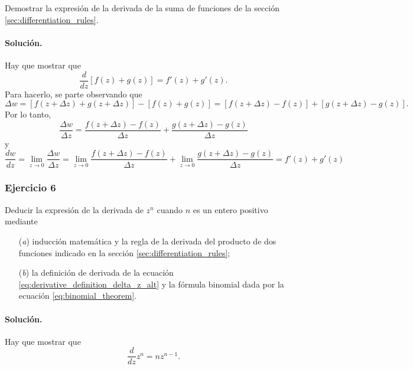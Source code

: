 \documentclass[a4paper]{report}
\begin{document}
Demostrar la expresión de la derivada de la suma de funciones de la sección \ref{sec:differentiation_rules}.

\paragraph{Solución.} Hay que mostrar que 
\[
 \frac{d}{dz}[f(z)+g(z)]=f'(z)+g'(z).
\]
Para hacerlo, se parte observando que 
\[
 \Delta w=[f(z+\Delta z)+g(z+\Delta z)]-[f(z)+g(z)]=[f(z+\Delta z)-f(z)]+[g(z+\Delta z)-g(z)].
\]
Por lo tanto,
\[
 \frac{\Delta w}{\Delta z}=\frac{f(z+\Delta z)-f(z)}{\Delta z}+\frac{g(z+\Delta z)-g(z)}{\Delta z}
\]
y
\[
 \frac{dw}{dz}=\lim_{z\to0}\frac{\Delta w}{\Delta z}=\lim_{z\to0}\frac{f(z+\Delta z)-f(z)}{\Delta z}+\lim_{z\to0}\frac{g(z+\Delta z)-g(z)}{\Delta z}=f'(z)+g'(z)
\]

\subsubsection{Ejercicio 6}

Deducir la expresión de la derivada de \(z^n\) cuando \(n\) es un entero positivo mediante
\begin{enumerate}
 \item[(\textit{a})] inducción matemática y la regla de la derivada del producto de dos funciones indicado en la sección \ref{sec:differentiation_rules};
 \item[(\textit{b})] la definición de derivada de la ecuación \ref{eq:derivative_definition_delta_z_alt} y la fórmula binomial dada por la ecuación \ref{eq:binomial_theorem}.
\end{enumerate}

\paragraph{Solución.}

Hay que mostrar que 
\[
 \frac{d}{dz}z^n=nz^{n-1}.
\]
\end{document}
